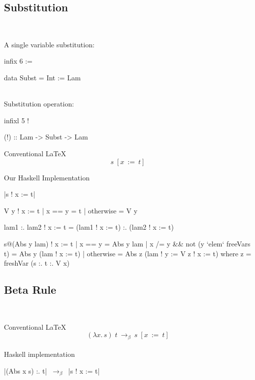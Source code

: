 \documentclass{beamer}
\begin{document}
\subsection{Substitution}
\begin{frame}{\insertsectionhead\ \textemdash\
    \insertsubsectionhead}

A single variable substitution:

\begin{code}
infix 6 :=

data Subst = Int := Lam
\end{code}~\\

Substitution operation:

\begin{code}
infixl 5 !

(!) :: Lam -> Subst -> Lam
\end{code}

\framebreak

Conventional \LaTeX
  \[
    s\; [x\ :=\ t]
  \]

  Our Haskell Implementation
  \begin{center}
  |s ! x := t|
  \end{center}

\framebreak

\begin{code}
V y ! x := t
  | x == y = t
  | otherwise = V y
\end{code}

\framebreak

\begin{code}
lam1 :. lam2 ! x := t =
  (lam1 ! x := t) :. (lam2 ! x := t)
\end{code}

\framebreak

\begin{code}
s@(Abs y lam) ! x := t
  | x == y = Abs y lam
  | x /= y && not (y `elem` freeVars t) =
    Abs y (lam ! x := t)
  | otherwise =
    Abs z (lam ! y := V z ! x := t)
  where
    z = freshVar (s :. t :. V x)
\end{code}
\end{frame}

\subsection{Beta Rule}
\begin{frame}[fragile]{\insertsectionhead\ \textemdash\
    \insertsubsectionhead}

Conventional \LaTeX
  \[
    (\lambda x.\, s)\; t\ \to_\beta\ s\; [x\ :=\ t]
  \]~\\
  Haskell implementation
  \begin{center}
     |(Abs x s) :. t| $\ \to_\beta\ $ |s ! x := t|
  \end{center}
\end{frame}
\end{document}
